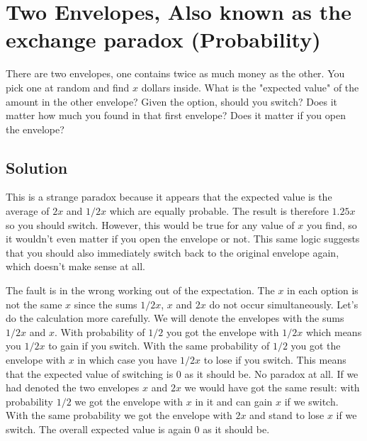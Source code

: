 \section{Two Envelopes, Also known as the exchange paradox (Probability)}
There are two envelopes, one contains twice as much money as the other. You pick one at random and find $x$ dollars inside. What is the "expected value" of the amount in the other envelope? Given the option, should you switch? Does it matter how much you found in that first envelope? Does it matter if you open the envelope?

\subsection{Solution}
This is a strange paradox because it appears that the expected value is the average of $2x$ and $1/2x$ which are equally probable. The result is therefore $1.25x$ so you should switch. However, this would be true for any value of $x$ you find, so it wouldn't even matter if you open the envelope or not. This same logic suggests that you should also immediately switch back to the original envelope again, which doesn't make sense at all.

The fault is in the wrong working out of the expectation. The $x$ in each option is not the same $x$ since the sums $1/2x$, $x$ and $2x$ do not occur simultaneously. Let's do the calculation more carefully. We will denote the envelopes with the sums $1/2x$ and $x$. With probability of $1/2$ you got the envelope with $1/2x$ which means you $1/2x$ to gain if you switch. With the same probability of $1/2$ you got the envelope with $x$ in which case you have $1/2x$ to lose if you switch. This means that the expected value of switching is $0$ as it should be. No paradox at all. If we had denoted the two envelopes $x$ and $2x$ we would have got the same result: with probability $1/2$ we got the envelope with $x$ in it and can gain $x$ if we switch. With the same probability we got the envelope with $2x$ and stand to lose $x$ if we switch. The overall expected value is again $0$ as it should be.
